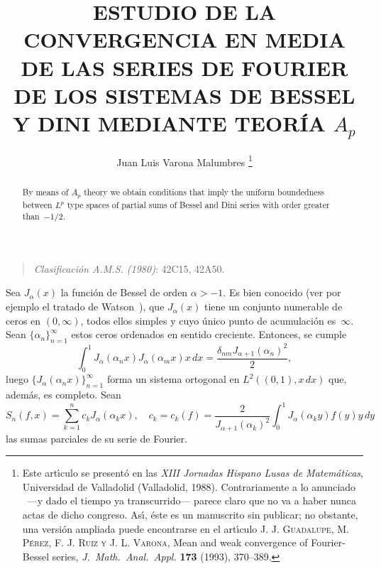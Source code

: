\documentclass[a4paper]{article}
\date{}
\title{ESTUDIO DE LA CONVERGENCIA EN MEDIA DE LAS SERIES DE FOURIER 
DE LOS SISTEMAS DE BESSEL Y DINI MEDIANTE TEOR\'IA $A_p$}
\author{Juan Luis Varona Malumbres%
\renewcommand\thefootnote{}
\renewcommand\footnotemark{}
\footnote{
Este art\'{\i}culo se present\'o en las
\textit{XIII Jornadas Hispano Lusas de Matem\'aticas}, 
Universidad de Valladolid (Valladolid, 1988).
Contrariamente a lo anunciado ~---y dado el tiempo ya transcurrido---
parece claro que no va a haber nunca actas de dicho congreso.
As\'{\i}, \'este es un manuscrito sin publicar; no obstante,
una versi\'on ampliada puede encontrarse en el art\'{\i}culo
\textsc{J. J. Guadalupe, M. P\'erez, F. J. Ruiz y J. L. Varona},
{Mean and weak convergence of Fourier-Bessel series},
\textit{J.\ Math.\ Anal.\ Appl.}
\textbf{173} (1993), 370--389.
}
}
\begin{document}

\maketitle


\begin{abstract}\noindent
By means of $A_p$ theory we obtain conditions 
that imply the uniform boundedness between $L^{p}$ type spaces of 
partial sums of Bessel and Dini series with order greater than~$-1/2$.
\end{abstract}

\begin{quote}
\textit{Clasificaci\'on A.M.S. (1980)}: 42C15, 42A50.
\end{quote}
\bigskip

Sea $J_{\alpha}(x)$ la funci\'on de Bessel de orden $\alpha > -1$.
Es bien conocido (ver por ejemplo el tratado de Watson~\cite{Wa}),
que $J_{\alpha}(x)$ tiene un conjunto numerable de ceros 
en $(0,\infty)$, todos ellos simples y cuyo \'unico punto de 
acumulaci\'on es~$\infty$. Sean $\{\alpha_{n}\}_{n=1}^{\infty}$ 
estos ceros ordenados en sentido creciente. Entonces, se cumple
\begin{equation*}
  \int_{0}^{1} J_{\alpha}(\alpha_{n}x)J_{\alpha}(\alpha_{m}x)x\,dx 
  = \frac{\delta_{nm}J_{\alpha+1}(\alpha_{n})^2}{2},
\end{equation*}
luego $\{J_{\alpha}(\alpha_{n}x)\}_{n=1}^{\infty}$ 
forma un sistema ortogonal en $L^2((0,1),x\,dx)$ que, adem\'as, 
es completo. Sean
\begin{equation*}
  S_{n}(f,x) = \sum_{k=1}^n c_{k}J_{\alpha}(\alpha_{k}x),
  \quad
  c_{k} = c_{k}(f) = \frac{2}{J_{\alpha+1}(\alpha_{k})^2}
  \int_{0}^{1} J_{\alpha}(\alpha_{k}y)f(y)y\,dy
\end{equation*}
las sumas parciales de su serie de Fourier.
\end{document}
